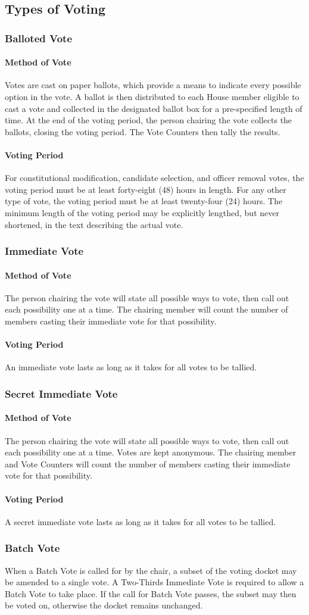 \documentclass{article}
\newcommand{\asection}[1]{\subsection{#1} \label{#1}}
\newcommand{\asubsection}[1]{\subsubsection{#1} \label{#1}}
\newcommand{\asubsubsection}[1]{\paragraph{#1} \label{#1}}
\begin{document}
\asection{Types of Voting}
\asubsection{Balloted Vote}
\asubsubsection{Method of Vote} 
Votes are cast on paper ballots, which provide a means to indicate every possible option in the vote. A ballot is then distributed to each House member eligible to cast a vote and collected in the designated ballot box for a pre-specified length of time. At the end of the voting period, the person chairing the vote collects the ballots, closing the voting period. The Vote Counters then tally the results.
\asubsubsection{Voting Period} 
For constitutional modification, candidate selection, and officer removal votes, the voting period must be at least forty-eight (48) hours in length. For any other type of vote, the voting period must be at least twenty-four (24) hours. The minimum length of the voting period may be explicitly lengthed, but never shortened, in the text describing the actual vote.
\asubsection{Immediate Vote}
\asubsubsection{Method of Vote} 
The person chairing the vote will state all possible ways to vote, then call out each possibility one at a time. The chairing member will count the number of members casting their immediate vote for that possibility.
\asubsubsection{Voting Period} 
An immediate vote lasts as long as it takes for all votes to be tallied.
\asubsection{Secret Immediate Vote}
\asubsubsection{Method of Vote} 
The person chairing the vote will state all possible ways to vote, then call out each possibility one at a time. Votes are kept anonymous. The chairing member and Vote Counters will count the number of members casting their immediate vote for that possibility.
\asubsubsection{Voting Period}
A secret immediate vote lasts as long as it takes for all votes to be tallied.
\asubsection{Batch Vote}
When a Batch Vote is called for by the chair, a subset of the voting docket may be amended to a single vote. A Two-Thirds Immediate Vote is required to allow a Batch Vote to take place. If the call for Batch Vote passes, the subset may then be voted on, otherwise the docket remains unchanged.
\end{document}
